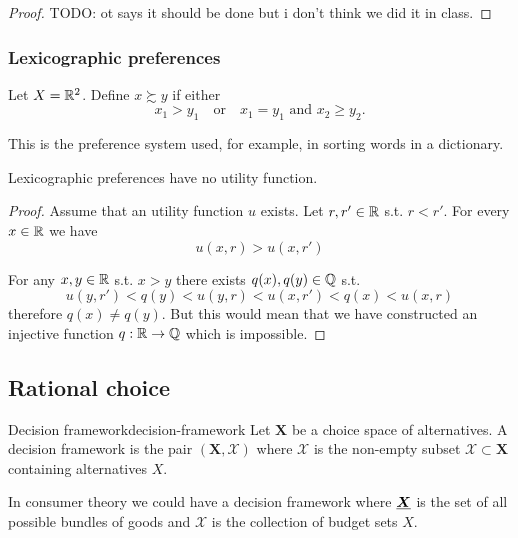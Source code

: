 \documentclass[12pt]{extarticle}
\renewcommand{\vec}[1]{\uvec{#1}}
\begin{document}
\begin{proof}
    TODO: ot says it should be done but i don't think we did it in class.
\end{proof}

\subsubsection{Lexicographic preferences}

Let $X = \mathbb{R}^2$. Define $x \succsim y$ if either
\begin{equation}
    x_1 > y_1 \quad \text{or} \quad x_1 = y_1 \text{ and } x_2 \geq y_2.
\end{equation}

This is the preference system used, for example, in sorting words in a dictionary.

\begin{proposition}{}{}
    Lexicographic preferences have no utility function.
\end{proposition}

\begin{proof}
    Assume that an utility function $u$ exists.
    Let $r, r' \in \mathbb{R}$ s.t. $r < r'$.
    For every $x \in \mathbb{R}$ we have
    \begin{equation}
        u(x, r) > u(x, r')
    \end{equation}

    For any $x, y \in \mathbb{R}$ s.t. $x > y$ there exists $q(x), q(y) \in \mathbb{Q}$ s.t.
    \begin{equation}
        u(y, r') < q(y) < u(y, r) < u(x, r') < q(x) < u(x, r)
    \end{equation}
    therefore $q(x) \ne q(y)$.
    But this would mean that we have constructed an injective function $q : \mathbb{R} \to \mathbb{Q}$ which is impossible.
\end{proof}

\subsection{Rational choice}

\begin{definition}{Decision framework}{decision-framework}
    Let $\bm X$ be a choice space of alternatives.
    A decision framework is the pair $(\bm X,\mathcal X)$
    where $\mathcal X$ is the non-empty subset $\mathcal X \subset \bm X$ containing alternatives $X$.
\end{definition}

In consumer theory we could have a decision framework where $\vec X$ is the set of all possible bundles of goods and $\mathcal X$ is the collection of budget sets $X$.
\end{document}
